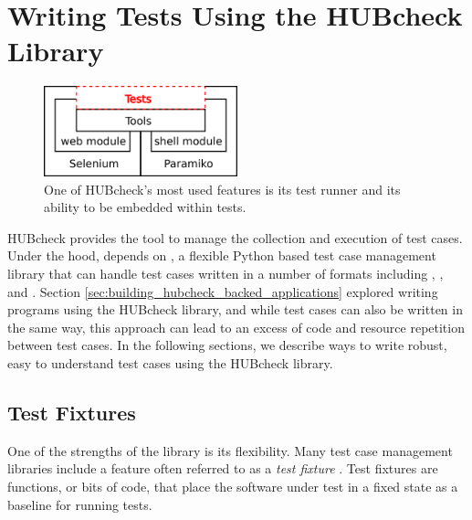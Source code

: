 




\section{Writing Tests Using the HUBcheck Library}
\label{sec:hubcheck_tests}

\begin{figure}[tbh]
  \centering
  \includegraphics[width=0.5\textwidth]
    {../../images/hubcheck_block_diagram/hubcheck_library_overview_tests.png}
  \caption{ One of HUBcheck's most used features is its test runner and its %
            ability to be embedded within tests. }
  \label{fig:hubzero_library_overview_tests}
\end{figure}

HUBcheck provides the  tool to manage the
collection and execution of test cases.  Under the hood,
 depends on , a flexible
Python based test case management library that can handle test cases written in
a number of formats including  \cite{unittest:2015:Online},
 \cite{nose:2015:Online}, and 
\cite{doctest:2015:Online}.  Section
\ref{sec:building_hubcheck_backed_applications} explored writing programs using
the HUBcheck library, and while test cases can also be written in the same way,
this approach can lead to an excess of code and resource repetition between
test cases. In the following sections, we describe ways to write robust, easy
to understand test cases using the HUBcheck library.

\subsection{Test Fixtures}
\label{ssec:hubcheck_tests_fixtures}

One of the strengths of the  library is its flexibility.  Many
test case management libraries include a feature often referred to as a
\textit{test fixture} \cite{TestFixture:Online}.  Test fixtures are functions,
or bits of code, that place the software under test in a fixed state as a
baseline for running tests.

